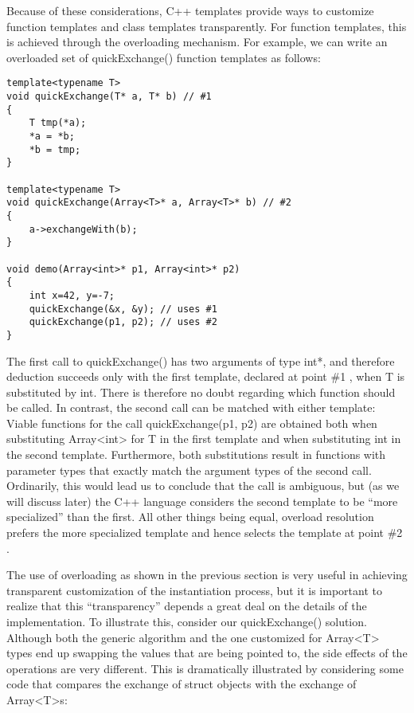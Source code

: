 Because of these considerations, C++ templates provide ways to customize function templates and class templates transparently. For function templates, this is achieved through the overloading mechanism. For example, we can write an overloaded set of quickExchange() function templates as follows:

\begin{lstlisting}[style=styleCXX]
template<typename T>
void quickExchange(T* a, T* b) // #1
{
	T tmp(*a);
	*a = *b;
	*b = tmp;
}

template<typename T>
void quickExchange(Array<T>* a, Array<T>* b) // #2
{
	a->exchangeWith(b);
}

void demo(Array<int>* p1, Array<int>* p2)
{
	int x=42, y=-7;
	quickExchange(&x, &y); // uses #1
	quickExchange(p1, p2); // uses #2
}
\end{lstlisting}

The first call to quickExchange() has two arguments of type int*, and therefore deduction succeeds only with the first template, declared at point \#1 , when T is substituted by int. There is therefore no doubt regarding which function should be called. In contrast, the second call can be matched with either template: Viable functions for the call quickExchange(p1, p2) are obtained both when substituting Array<int> for T in the first template and when substituting int in the second template. Furthermore, both substitutions result in functions with parameter types that exactly match the argument types of the second call. Ordinarily, this would lead us to conclude that the call is ambiguous, but (as we will discuss later) the C++ language considers the second template to be “more specialized” than the first. All other things being equal, overload resolution prefers the more specialized template and hence selects the template at point \#2 .



The use of overloading as shown in the previous section is very useful in achieving transparent customization of the instantiation process, but it is important to realize that this “transparency” depends a great deal on the details of the implementation. To illustrate this, consider our quickExchange() solution. Although both the generic algorithm and the one customized for Array<T> types end up swapping the values that are being pointed to, the side effects of the operations are very different. This is dramatically illustrated by considering some code that compares the exchange of struct objects with the exchange of Array<T>s:


